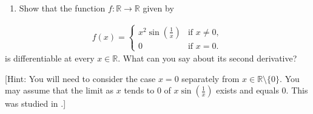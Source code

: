 \documentclass[letterpaper,10pt,english]{jupyterBook}
\begin{document}
\label{\detokenize{Problems:id42}}\begin{enumerate}
%
\setcounter{enumi}{41}
\item {} 
\sphinxAtStartPar
Show that the function  \(f:\mathbb{R}\to \mathbb{R}\) given by

\end{enumerate}
\begin{equation*}
\begin{split}
f(x) = \begin{cases} x^2\sin\left(\frac{1}{x}\right) & \text{if }x \neq 0,\\ 0 & \text{if }x = 0.\end{cases}
\end{split}
\end{equation*}
\sphinxAtStartPar
is differentiable at every \(x \in \mathbb{R}\). What can you say about its second derivative?

{[}Hint: You will need to consider the case \(x=0\) separately from \(x\in\mathbb{R}\setminus\{0\}\). You may assume that the limit as \(x\) tends to \(0\) of \(x\sin\left(\frac{1}{x}\right)\) exists and equals \(0\). This was studied in {\hyperref[\detokenize{Problems:id10}]{}}.{]}
\end{document}
